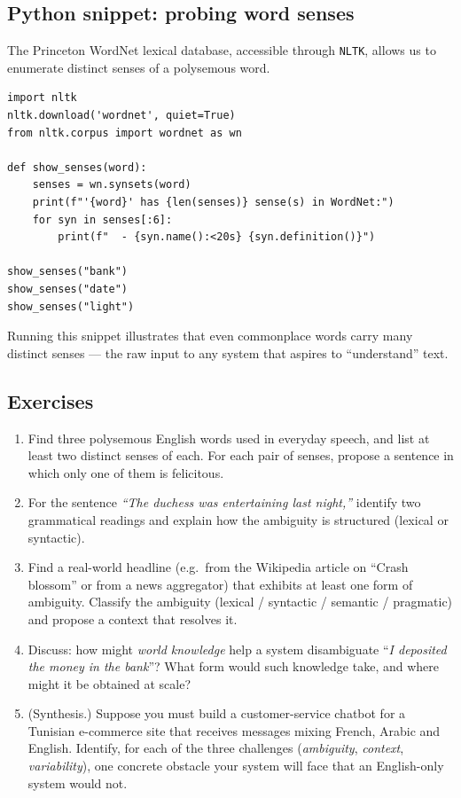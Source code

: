 \subsection{Python snippet: probing word senses}

The Princeton WordNet lexical database, accessible through \texttt{NLTK}, allows us to enumerate distinct senses of a polysemous word.

\begin{lstlisting}
import nltk
nltk.download('wordnet', quiet=True)
from nltk.corpus import wordnet as wn

def show_senses(word):
    senses = wn.synsets(word)
    print(f"'{word}' has {len(senses)} sense(s) in WordNet:")
    for syn in senses[:6]:
        print(f"  - {syn.name():<20s} {syn.definition()}")

show_senses("bank")
show_senses("date")
show_senses("light")
\end{lstlisting}

Running this snippet illustrates that even commonplace words carry many distinct senses --- the raw input to any system that aspires to ``understand'' text.

\subsection{Exercises}
\begin{enumerate}
    \item Find three polysemous English words used in everyday speech, and list at least two distinct senses of each. For each pair of senses, propose a sentence in which only one of them is felicitous.
    \item For the sentence \emph{``The duchess was entertaining last night,''} identify two grammatical readings and explain how the ambiguity is structured (lexical or syntactic).
    \item Find a real-world headline (e.g.\ from the Wikipedia article on ``Crash blossom'' or from a news aggregator) that exhibits at least one form of ambiguity. Classify the ambiguity (lexical / syntactic / semantic / pragmatic) and propose a context that resolves it.
    \item Discuss: how might \emph{world knowledge} help a system disambiguate ``\emph{I deposited the money in the bank}''? What form would such knowledge take, and where might it be obtained at scale?
    \item (Synthesis.) Suppose you must build a customer-service chatbot for a Tunisian e-commerce site that receives messages mixing French, Arabic and English. Identify, for each of the three challenges (\emph{ambiguity}, \emph{context}, \emph{variability}), one concrete obstacle your system will face that an English-only system would not.
\end{enumerate}

